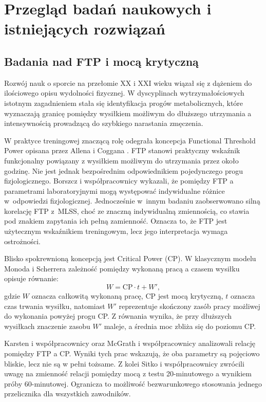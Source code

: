 \section{Przegląd badań naukowych i istniejących rozwiązań}

\subsection{Badania nad FTP i mocą krytyczną}

Rozwój nauk o sporcie na przełomie XX i XXI wieku wiązał się z dążeniem do ilościowego opisu wydolności fizycznej. W dyscyplinach wytrzymałościowych istotnym zagadnieniem stała się identyfikacja progów metabolicznych, które wyznaczają granicę pomiędzy wysiłkiem możliwym do dłuższego utrzymania a intensywnością prowadzącą do szybkiego narastania zmęczenia.

W praktyce treningowej znaczącą rolę odegrała koncepcja Functional Threshold Power opisana przez Allena i Coggana \parencite{allen2019power}. FTP stanowi praktyczny wskaźnik funkcjonalny powiązany z wysiłkiem możliwym do utrzymania przez około godzinę. Nie jest jednak bezpośrednim odpowiednikiem pojedynczego progu fizjologicznego. Borszcz i współpracownicy \parencite{borszcz2018ftp} wykazali, że pomiędzy FTP a parametrami laboratoryjnymi mogą występować indywidualne różnice w~odpowiedzi fizjologicznej. Jednocześnie w~innym badaniu \parencite{borszcz2019ftp_mlss} zaobserwowano silną korelację FTP z~MLSS, choć ze znaczną indywidualną zmiennością, co stawia pod znakiem zapytania ich pełną zamienność. Oznacza to, że FTP jest użytecznym wskaźnikiem treningowym, lecz jego interpretacja wymaga ostrożności.

Blisko spokrewnioną koncepcją jest Critical Power (CP). W klasycznym modelu Monoda i Scherrera zależność pomiędzy wykonaną pracą a czasem wysiłku opisuje równanie:
\begin{equation}
\label{eq:critical_power}
W = \mathrm{CP} \cdot t + W',
\end{equation}
gdzie $W$ oznacza całkowitą wykonaną pracę, $\mathrm{CP}$ jest mocą krytyczną, $t$ oznacza czas trwania wysiłku, natomiast $W'$ reprezentuje skończony zasób pracy możliwej do wykonania powyżej progu CP. Z równania wynika, że przy dłuższych wysiłkach znaczenie zasobu $W'$ maleje, a średnia moc zbliża się do poziomu CP.

Karsten i współpracownicy \parencite{karsten2021cpftp} oraz McGrath i współpracownicy \parencite{mcgrath2021cpftp} analizowali relację pomiędzy FTP a CP. Wyniki tych prac wskazują, że oba parametry są pojęciowo bliskie, lecz nie są w pełni tożsame. Z kolei Sitko i współpracownicy \parencite{sitko2023_ac20to60_update} zwrócili uwagę na zmienność relacji pomiędzy mocą z testu 20-minutowego a wynikiem próby 60-minutowej. Ogranicza to możliwość bezwarunkowego stosowania jednego przelicznika dla wszystkich zawodników.

